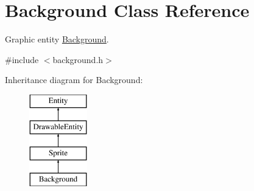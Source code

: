 \hypertarget{class_background}{}\section{Background Class Reference}
\label{class_background}


Graphic entity \hyperlink{class_background}{Background}.  




{\ttfamily \#include $<$background.\+h$>$}

Inheritance diagram for Background\+:\begin{figure}[H]
\begin{center}
\leavevmode
\includegraphics[height=4.000000cm]{class_background}
\end{center}
\end{figure}
